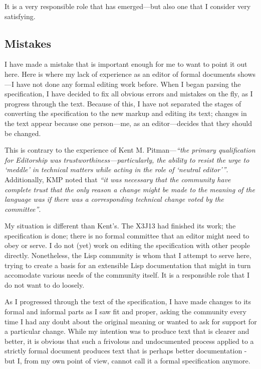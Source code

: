 It is a very responsible role that has emerged---but also one that I consider very satisfying.

\subsection{Mistakes}

I have made a mistake that is important enough for me to want to point it out here. Here is where my lack of experience as an editor of formal documents shows---I have not done any formal editing work before. When I began parsing the specification, I have decided to fix all obvious errors and mistakes on the fly, as I progress through the text. Because of this, I have not separated the stages of converting the specification to the new markup and editing its text; changes in the text appear because one person---me, as an editor---decides that they should be changed.

This is contrary to the experience of Kent M. Pitman---\textit{``the primary qualification for Editorship was trustworthi\-ness---particularly, the ability to resist the urge to `meddle' in technical matters while acting in the role of `neutral editor'''}.\cite{kmp:2012:untold} Additionally, KMP noted that \textit{``it was necessary that the community have complete trust that the only reason a change might be made to the meaning of the language was if there was a corresponding technical change voted by the committee''}.\cite{kmp:2012:untold}

My situation is different than Kent's. The X3J13 had finished its work; the specification is done; there is no formal committee that an editor might need to obey or serve.  I do not (yet) work on editing the specification with other people directly. Nonetheless, the Lisp community is whom that I attempt to serve here, trying to create a basis for an extensible Lisp documentation that might in turn accomodate various needs of the community itself. It is a responsible role that I do not want to do loosely.

As I progressed through the text of the specification, I have made changes to its formal and informal parts as I saw fit and proper, asking the community every time I had any doubt about the original meaning or wanted to ask for support for a particular change. While my intention was to produce text that is clearer and better, it is obvious that such a frivolous and undocumented process applied to a strictly formal document produces text that is perhaps better documentation - but I, from my own point of view, cannot call it a formal specification anymore.


